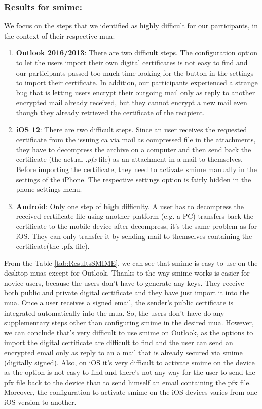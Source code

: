 \subsubsection{Results for \acrshort{smime}:}
We focus on the steps that we identified as highly difficult for our participants, in the context of their respective \acrshort{mua}:
\begin{enumerate}
	\item \textbf{Outlook 2016/2013}: There are two difficult steps. The configuration option to let the users import their own digital certificates is not easy to find and our participants passed too much time looking for the button in the settings to import their certificate. In addition, our participants experienced a strange bug that is letting users encrypt their outgoing mail only as reply to another encrypted mail already received, but they cannot encrypt a new mail even though they already retrieved the certificate of the recipient.
	\item \textbf{iOS 12}: There are two difficult steps. Since an user receives the requested certificate from the issuing \acrlong{ca} via mail as compressed file in the attachments, they have to decompress the archive on a computer and then send back the certificate (the actual \emph{.pfx} file) as an attachment in a mail to themselves. Before importing the certificate, they need to activate \acrshort{smime} manually in the settings of the iPhone. The respective settings option is fairly hidden in the phone settings menu.
	\item \textbf{Android}: Only one step of \textbf{high} difficulty. A user has to decompress the received certificate file using another platform (e.g. a PC) transfers back the certificate to the mobile device after decompress, it's the same problem as for iOS. They can only transfer it by sending mail to themselves containing the certificate(the .pfx file).
\end{enumerate}
From the Table \ref{tab:ResultsSMIME}, we can see that \acrshort{smime} is easy to use on the desktop \acrshort{mua}s except for Outlook. Thanks to the way \acrshort{smime} works is easier for novice users, because the users don't have to generate any keys. They receive both public and private digital certificate and they have just import it into the \acrshort{mua}. Once a user receives a signed email, the sender's public certificate is integrated automatically into the \acrshort{mua}. So, the users don't have do any supplementary steps other than configuring \acrshort{smime} in the desired \acrshort{mua}. However, we can conclude that's very difficult to use \acrshort{smime} on Outlook, as the options to import the digital certificate are difficult to find and the user can send an encrypted email only as reply to an a mail that is already secured via \acrshort{smime} (digitally signed). Also, on iOS it's very difficult to activate \acrshort{smime} on the device as the option is not easy to find and there's not any way for the user to send the pfx file back to the device than to send himself an email containing the pfx file. Moreover, the configuration to activate \acrshort{smime} on the iOS devices varies from one iOS version to another.

